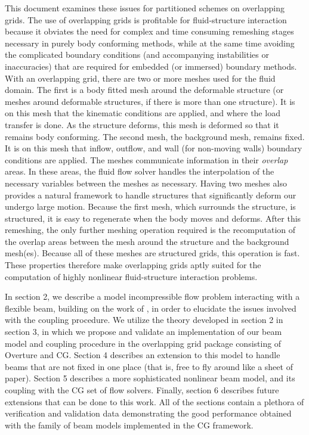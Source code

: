 \documentclass{article}
\begin{document}
This document examines these issues for partitioned schemes on overlapping grids.  
The use of overlapping grids is profitable for fluid-structure interaction because it obviates the need for complex and time consuming remeshing stages necessary in purely body conforming methods, while at the same time avoiding the complicated boundary conditions (and accompanying instabilities or inaccuracies) that are required for embedded (or immersed) boundary methods.
With an overlapping grid, there are two or more meshes used for the fluid domain.  
The first is a body fitted mesh around the deformable structure (or meshes around deformable structures, if there is more than one structure).  
It is on this mesh that the kinematic conditions are applied, and where the load transfer is done.
As the structure deforms, this mesh is deformed so that it remains body conforming.
The second mesh, the background mesh, remains fixed.  
It is on this mesh that inflow, outflow, and wall (for non-moving walls) boundary conditions are applied.
The meshes communicate information in their \emph{overlap} areas.  
In these areas, the fluid flow solver handles the interpolation of the necessary variables between the meshes as necessary.
Having two meshes also provides a natural framework to handle structures that significantly deform our undergo large motion.
Because the first mesh, which surrounds the structure, is structured, it is easy to regenerate when the body moves and deforms.
After this remeshing, the only further meshing operation required is the recomputation of the overlap areas between the mesh around the structure and the background mesh(es).
Because all of these meshes are structured grids, this operation is fast.  
These properties therefore make overlapping grids aptly suited for the computation of highly nonlinear fluid-structure interaction problems.

In section 2, we describe a model incompressible flow problem interacting with a flexible beam, building on the work of \cite{Causin2004}, in order to elucidate the issues involved with the coupling procedure.
We utilize the theory developed in section 2 in section 3, in which we propose and validate an implementation of our beam model and coupling procedure in the overlapping grid package consisting of Overture and CG.  
Section 4 describes an extension to this model to handle beams that are not fixed in one place (that is, free to fly around like a sheet of paper).
Section 5 describes a more sophisticated nonlinear beam model, and its coupling with the CG set of flow solvers.
Finally, section 6 describes future extensions that can be done to this work.
All of the sections contain a plethora of verification and validation data demonstrating the good performance obtained with the family of beam models implemented in the CG framework.
\end{document}
